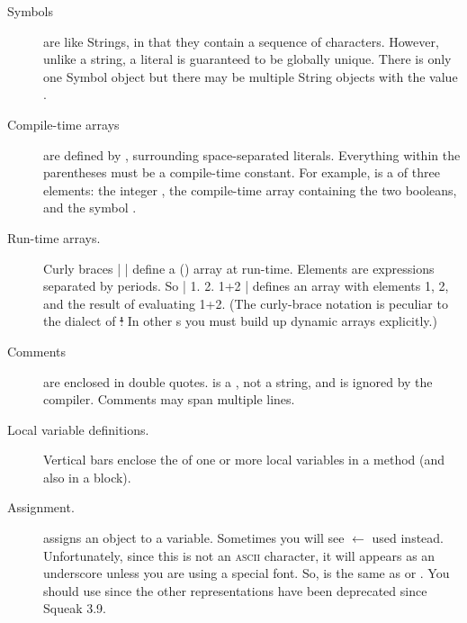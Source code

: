 \documentclass[a4paper,10pt,twoside]{book}
\begin{document}
\begin{description}
\item[Symbols] are like Strings, in that they contain a sequence of characters.  
	However, unlike a string, a literal  is guaranteed to be globally unique.
		There is only one Symbol object  but there may be multiple String objects with the value .

\item[Compile-time arrays] are defined by \ct{#( )}, surrounding space-separated literals.
		Everything within the parentheses must be a compile-time constant.
		For example,   is a   of three elements: the integer , the compile-time array containing the two booleans, and the symbol .

\item[Run-time arrays.] Curly braces \ct|{ }| define a () array at run-time.
		Elements are expressions separated by periods.
		So \ct|{ 1. 2. 1+2 }| defines an array with elements 1, 2, and the result of evaluating 1+2.
		(The curly-brace notation is peculiar to the \sq dialect of \st!
		In other \st{}s you must build up dynamic arrays explicitly.)

\item[Comments] are enclosed in double quotes.
		 is a , not a string, and is ignored by the \sq compiler.
		Comments may span multiple lines.
		
\item[Local variable definitions.]	Vertical bars \ct{| |} enclose the  of one or more local variables in a method (and also in a block).

\item[Assignment.]	\ct{:=} assigns an object to a variable.
		Sometimes you will see $\leftarrow$ used instead.
		Unfortunately, since this is not an \textsc{ascii} character, it will appears as an underscore unless
		you are using a special font.
		So,  is the same as  or . You should use \ct{:=} since the other representations have been deprecated since Squeak 3.9.


\end{description}
\end{document}
